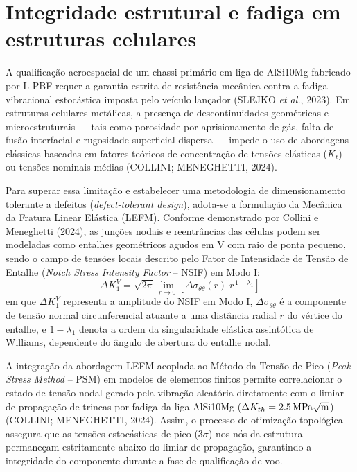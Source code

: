 \section{Integridade estrutural e fadiga em estruturas celulares}
\label{sec:fadiga}

A qualificação aeroespacial de um chassi primário em liga de AlSi10Mg fabricado por L-PBF requer a garantia estrita de resistência mecânica contra a fadiga vibracional estocástica imposta pelo veículo lançador (SLEJKO \textit{et al.}, 2023). Em estruturas celulares metálicas, a presença de descontinuidades geométricas e microestruturais — tais como porosidade por aprisionamento de gás, falta de fusão interfacial e rugosidade superficial dispersa — impede o uso de abordagens clássicas baseadas em fatores teóricos de concentração de tensões elásticas ($K_t$) ou tensões nominais médias (COLLINI; MENEGHETTI, 2024).

Para superar essa limitação e estabelecer uma metodologia de dimensionamento tolerante a defeitos (\textit{defect-tolerant design}), adota-se a formulação da Mecânica da Fratura Linear Elástica (LEFM). Conforme demonstrado por Collini e Meneghetti (2024), as junções nodais e reentrâncias das células podem ser modeladas como entalhes geométricos agudos em V com raio de ponta pequeno, sendo o campo de tensões locais descrito pelo Fator de Intensidade de Tensão de Entalhe (\textit{Notch Stress Intensity Factor} -- NSIF) em Modo I:
\begin{equation}
  \Delta K_1^{V} = \sqrt{2\pi}\,\lim_{r \to 0} \left[ \Delta\sigma_{\theta\theta}(r)\; r^{\,1-\lambda_1} \right]
  \label{eq:nsif}
\end{equation}
em que $\Delta K_1^{V}$ representa a amplitude do NSIF em Modo I, $\Delta\sigma_{\theta\theta}$ é a componente de tensão normal circunferencial atuante a uma distância radial $r$ do vértice do entalhe, e $1-\lambda_1$ denota a ordem da singularidade elástica assintótica de Williams, dependente do ângulo de abertura do entalhe nodal.

A integração da abordagem LEFM acoplada ao Método da Tensão de Pico (\textit{Peak Stress Method} -- PSM) em modelos de elementos finitos permite correlacionar o estado de tensão nodal gerado pela vibração aleatória diretamente com o limiar de propagação de trincas por fadiga da liga AlSi10Mg ($\Delta K_{th} = \SI{2.5}{\mega\pascal\sqrt{\metre}}$) (COLLINI; MENEGHETTI, 2024). Assim, o processo de otimização topológica assegura que as tensões estocásticas de pico ($3\sigma$) nos nós da estrutura permaneçam estritamente abaixo do limiar de propagação, garantindo a integridade do componente durante a fase de qualificação de voo.

